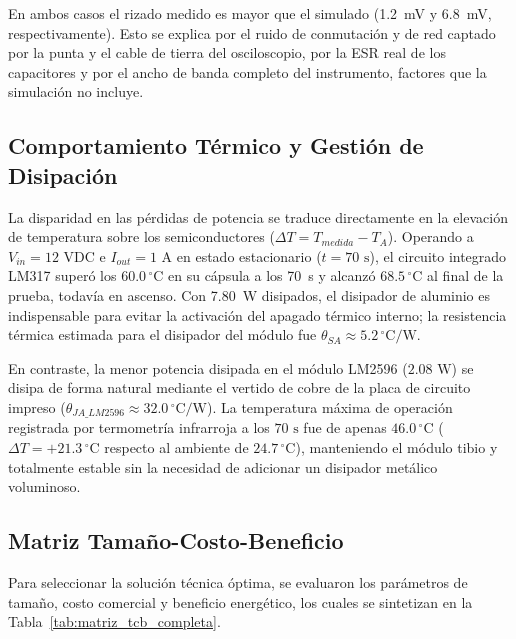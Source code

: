 \documentclass[conference]{IEEEtran}
\begin{document}
En ambos casos el rizado medido es mayor que el simulado (1.2~mV y 6.8~mV, respectivamente). Esto se explica por el ruido de conmutación y de red captado por la punta y el cable de tierra del osciloscopio, por la ESR real de los capacitores y por el ancho de banda completo del instrumento, factores que la simulación no incluye.

\FloatBarrier
\subsection{\textbf{Comportamiento Térmico y Gestión de Disipación}}
La disparidad en las pérdidas de potencia se traduce directamente en la elevación de temperatura sobre los semiconductores ($\Delta T = T_{medida} - T_A$). Operando a $V_{in} = 12\text{ VDC}$ e $I_{out} = 1\text{ A}$ en estado estacionario ($t = 70\text{ s}$), el circuito integrado LM317 superó los $60.0\,^{\circ}\text{C}$ en su cápsula a los 70~s y alcanzó $68.5\,^{\circ}\text{C}$ al final de la prueba, todavía en ascenso. Con 7.80~W disipados, el disipador de aluminio es indispensable para evitar la activación del apagado térmico interno; la resistencia térmica estimada para el disipador del módulo fue $\theta_{SA} \approx 5.2\,^{\circ}\text{C/W}$.

\smallskip
En contraste, la menor potencia disipada en el módulo LM2596 ($2.08\text{ W}$) se disipa de forma natural mediante el vertido de cobre de la placa de circuito impreso ($\theta_{JA\_LM2596} \approx 32.0\,^{\circ}\text{C/W}$). La temperatura máxima de operación registrada por termometría infrarroja a los $70\text{ s}$ fue de apenas $46.0\,^{\circ}\text{C}$ ($\Delta T = +21.3\,^{\circ}\text{C}$ respecto al ambiente de $24.7\,^{\circ}\text{C}$), manteniendo el módulo tibio y totalmente estable sin la necesidad de adicionar un disipador metálico voluminoso.

\FloatBarrier
\subsection{\textbf{Matriz Tamaño-Costo-Beneficio}}
Para seleccionar la solución técnica óptima, se evaluaron los parámetros de tamaño, costo comercial y beneficio energético, los cuales se sintetizan en la Tabla~\ref{tab:matriz_tcb_completa}.
\end{document}
